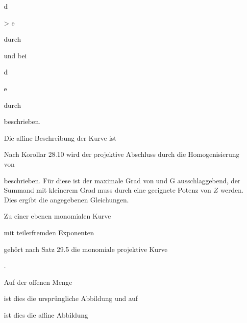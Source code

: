 {{{{d
}

{ > }{ e
}

{  }{
}

{    }{
}

{   }{
}

}
{}{}{}
durch


 {  }


und bei


\mavergleichskette

{\vergleichskette

{d
}

{ \leq }{e
}

{  }{
}

{    }{
}

{   }{
}

}
{}{}{}
durch


 {  }


beschrieben.}

\faktzusatz {}

\faktzusatz {}


}

{


Die affine Beschreibung der Kurve ist

 Nach
Korollar 28.10 wird der projektive Abschluss durch die Homogenisierung von

 beschrieben. Für diese ist der maximale Grad von   {  und  }  {  G   }{ } ausschlaggebend, der Summand mit kleinerem Grad muss durch eine geeignete Potenz von $Z$  werden. Dies ergibt die angegebenen Gleichungen.


}




Zu einer ebenen monomialen Kurve

 mit teilerfremden Exponenten

 gehört nach
Satz 29.5
die monomiale projektive Kurve


 { . }


Auf der offenen Menge

 ist dies die ursprüngliche Abbildung und auf

 ist dies die affine Abbildung


